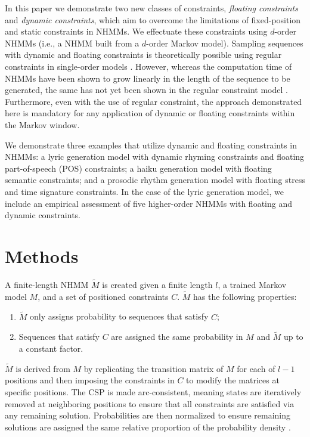 \documentclass[phd,electronic,oneside,twosidetoc,letterpaper,chaptercenter,parttop,lol,lof,lot]{byumsphd}
\begin{document}
In this paper we demonstrate two new classes of constraints, \textit{floating constraints} and \textit{dynamic constraints}, which aim to overcome the limitations of fixed-position and static constraints in NHMMs. We effectuate these constraints using $d$-order NHMMs (i.e., a NHMM built from a $d$-order Markov model). Sampling sequences with dynamic and floating constraints is theoretically possible using regular constraints in single-order models \cite{pesant2004regular,papadopoulos2014avoiding,papadopoulos2015exact,bodily2018relational}. However, whereas the computation time of NHMMs have been shown to grow linearly in the length of the sequence to be generated, the same has not yet been shown in the regular constraint model \cite{bodily2018relational}. Furthermore, even with the use of regular constraint, the approach demonstrated here is mandatory for any application of dynamic or floating constraints within the Markov window.

We demonstrate three examples that utilize dynamic and floating constraints in NHMMs: a lyric generation model with dynamic rhyming constraints and floating part-of-speech (POS) constraints; a haiku generation model with floating semantic constraints; and a prosodic rhythm generation model with floating stress and time signature constraints. In the case of the lyric generation model, we include an empirical assessment of five higher-order NHMMs with floating and dynamic constraints.

\section{Methods}

A finite-length NHMM $\tilde{M}$ is created given a finite length $l$, a trained Markov model $M$, and a set of positioned constraints $C$. $\tilde{M}$ has the following properties:
\begin{enumerate}
\item $\tilde{M}$ only assigns probability to sequences that satisfy $C$;
\item Sequences that satisfy $C$ are assigned the same probability in $M$ and $\tilde{M}$ up to a constant factor.
\end{enumerate}
$\tilde{M}$ is derived from $M$ by replicating the transition matrix of $M$ for each of $l-1$ positions and then imposing the constraints in $C$ to modify the matrices at specific positions. The CSP is made arc-consistent, meaning states are iteratively removed at neighboring positions to ensure that all constraints are satisfied via any remaining solution. Probabilities are then normalized to ensure remaining solutions are assigned the same relative proportion of the probability density \cite{pachet2011finite}.
\end{document}
